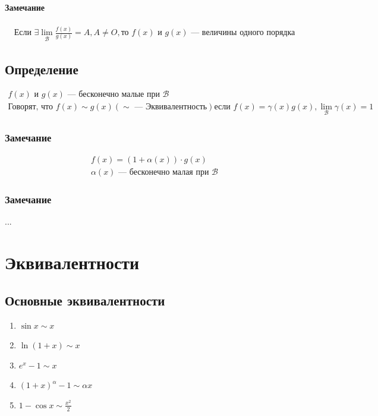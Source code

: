\documentclass{article}
\begin{document}
\paragraph{Замечание}
\begin{gather}
    \text{Если } \exists \lim_{\mathcal{B}} \frac{f(x)}{g(x)} = A, A \neq O,
    \text{то } f(x) \text{ и } g(x) \text{ --- величины одного порядка}
\end{gather}


\subsection{Определение}
\begin{gather*}
    f(x) \text{ и } g(x) \text{ --- бесконечно малые при } \mathcal{B} \\
    \text{Говорят, что } f(x) \sim g(x) (\sim \text{ --- Эквивалентность})
    \text{если } f(x) = \gamma(x) g(x), \lim_{\mathcal{B}} \gamma(x) = 1
\end{gather*}

\subsubsection{Замечание}
\begin{gather*}
    f(x) = (1 + \alpha(x)) \cdot g(x) \\
    \alpha(x) \text{ --- бесконечно малая при } \mathcal{B}
\end{gather*}

\subsubsection{Замечание}
...


\section{Эквивалентности}

\subsection{Основные эквивалентности}
\begin{enumerate}
    \item $\sin x \sim x$
    \item $\ln(1 + x) \sim x$
    \item $e^x - 1 \sim x$
    \item $(1 + x)^{\alpha} - 1 \sim \alpha x$
    \item $1 - \cos x \sim \frac{x^2}{2}$
\end{enumerate}
\end{document}
